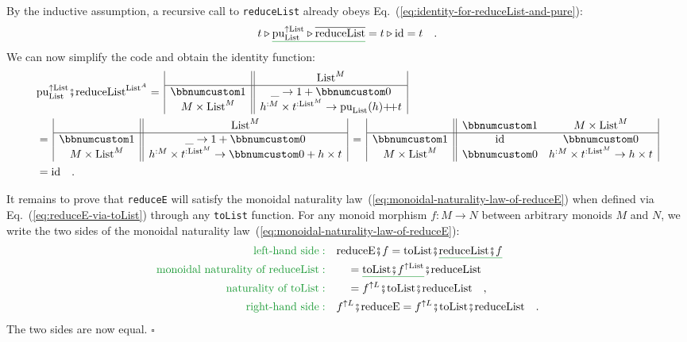 By the inductive assumption, a recursive call to \lstinline!reduceList!
already obeys Eq.~(\ref{eq:identity-for-reduceList-and-pure}):
\[
t\triangleright\gunderline{\text{pu}_{\text{List}}^{\uparrow\text{List}}\triangleright\overline{\text{reduceList}}}=t\triangleright\text{id}=t\quad.
\]
We can now simplify the code and obtain the identity function:
\begin{align*}
 & \text{pu}_{\text{List}}^{\uparrow\text{List}}\bef\text{reduceList}^{\text{List}^{A}}=\,\begin{array}{|c||c|}
 & \text{List}^{M}\\
\hline \bbnum 1 & \_\rightarrow1+\bbnum 0\\
M\times\text{List}^{M} & h^{:M}\times t^{:\text{List}^{M}}\rightarrow\text{pu}_{\text{List}}(h)\pplus t
\end{array}\\
 & =\,\begin{array}{|c||c|}
 & \text{List}^{M}\\
\hline \bbnum 1 & \_\rightarrow1+\bbnum 0\\
M\times\text{List}^{M} & h^{:M}\times t^{:\text{List}^{M}}\rightarrow\bbnum 0+h\times t
\end{array}\,=\,\begin{array}{|c||cc|}
 & \bbnum 1 & M\times\text{List}^{M}\\
\hline \bbnum 1 & \text{id} & \bbnum 0\\
M\times\text{List}^{M} & \bbnum 0 & h^{:M}\times t^{:\text{List}^{M}}\rightarrow h\times t
\end{array}\\
 & =\text{id}\quad.
\end{align*}

It remains to prove that \lstinline!reduceE! will satisfy the monoidal
naturality law~(\ref{eq:monoidal-naturality-law-of-reduceE}) when
defined via Eq.~(\ref{eq:reduceE-via-toList}) through any \lstinline!toList!
function. For any monoid morphism $f:M\rightarrow N$ between arbitrary
monoids $M$ and $N$, we write the two sides of the monoidal naturality
law~(\ref{eq:monoidal-naturality-law-of-reduceE}):
\begin{align*}
{\color{greenunder}\text{left-hand side}:}\quad & \text{reduceE}\bef f=\text{toList}\bef\gunderline{\text{reduceList}\bef f}\\
{\color{greenunder}\text{monoidal naturality of }\text{reduceList}:}\quad & \quad=\gunderline{\text{toList}\bef f^{\uparrow\text{List}}}\bef\text{reduceList}\\
{\color{greenunder}\text{naturality of }\text{toList}:}\quad & \quad=f^{\uparrow L}\bef\text{toList}\bef\text{reduceList}\quad,\\
{\color{greenunder}\text{right-hand side}:}\quad & f^{\uparrow L}\bef\text{reduceE}=f^{\uparrow L}\bef\text{toList}\bef\text{reduceList}\quad.
\end{align*}
The two sides are now equal. $\square$

